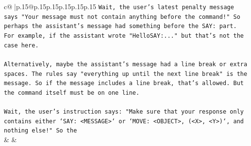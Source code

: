 \documentclass{article}
\begin{document}
{\begin{supertabular}{c@{$\;$}|p{.15\linewidth}@{}p{.15\linewidth}p{.15\linewidth}p{.15\linewidth}p{.15\linewidth}p{.15\linewidth}}
{{{\texttt{Wait, the user's latest penalty message says "Your message must not contain anything before the command!" So perhaps the assistant's message had something before the SAY: part. For example, if the assistant wrote "HelloSAY:..." but that's not the case here.} \\
\\ 
\texttt{Alternatively, maybe the assistant's message had a line break or extra spaces. The rules say "everything up until the next line break" is the message. So if the message includes a line break, that's allowed. But the command itself must be on one line.} \\
\\ 
\texttt{Wait, the user's instruction says: "Make sure that your response only contains either `SAY: <MESSAGE>` or `MOVE: <OBJECT>, (<X>, <Y>)`, and nothing else!" So the} \\
            }
        }
    }
    & & \\ \\


\end{supertabular}}
\end{document}
